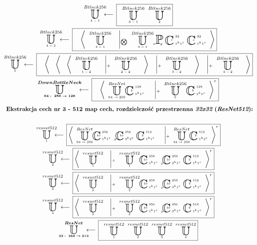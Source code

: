 \begin{equation*}
\begin{gathered}
\xunitdef{Btlnck256}{4-1}{\quad
\xunit{Btlnck256}{3-1}{} \quad
\xunit{Btlnck256}{2}{}}
\\
\xunitdef{Btlnck256}{4-2}{\quad
\xaggreg{\quad
\xunit{Btlnck256}{4-1}{}
\quad \left|_{\bigotimes} \quad
\xunit{Btlnck256}{4-1}{}
\xpool{g}{}{a}{}{}
\xconv{\ 1^k1^s}{\ 32}{}{}{r}
\xconv{\ 1^k1^s}{\ 32}{}{}{s}
\right.}}
\\
\xunitdef{Btlnck256}{5}{\quad
\xaggreg{\quad
\xaggreg{\quad
\xaggreg{\quad
\xunit{Btlnck256}{1-2}{}
\quad \left|_+ \quad
\xunit{Btlnck256}{2-2}{}
\right.\quad}
\quad \left|_+ \quad
\xunit{Btlnck256}{3-2}{}
\right.\quad}
\quad \left|_+ \quad
\xunit{Btlnck256}{4-2}{}
\right.\quad}}
\\
\xunitdef{\boldsymbol{DownBottleNeck}}{\boldsymbol{64:\ 256\rightarrow128}}{\quad
\xaggreg{\quad
\xunit{ResNet}{64\rightarrow256}{}
\xconv{\ 1^k1^s}{\ 128}{}{}{b}
\quad \left|_+ \quad
\xunit{Btlnck256}{5}{}
\xconv{\ 1^k1^s}{\ 128}{}{}{b}
\right.}^r}
\end{gathered}
\end{equation*}
\begin{equation*}
\begin{gathered}
\textbf{Ekstrakcja cech nr 3 - 512 map cech, rozdzielczość przestrzenna $\textit{32x32}$ ($\textit{ResNet512}$):}
\\~\\
\xunitdef{resnet512}{1}{
\xaggreg{\quad
\xunit{ResNet}{64\rightarrow256}{}
\xconv{\ 1^k1^s}{\ 256}{}{}{br}
\xconv{\ 3^k2^s}{\ 256}{p}{}{br}
\xconv{\ 1^k1^s}{\ 512}{}{}{b}
\quad \left|_+ \quad
\xunit{ResNet}{64\rightarrow256}{}
\xconv{\ 1^k2^s}{\ 512}{}{}{b}
\right.}^r}
\\
\xunitdef{resnet512}{2}{
\xaggreg{\quad
\xunit{resnet512}{1}{}
\quad \left|_+ \quad
\xunit{resnet512}{1}{}
\xconv{\ 1^k1^s}{\ 256}{}{}{br}
\xconv{\ 3^k1^s}{\ 256}{p}{}{br}
\xconv{\ 1^k1^s}{\ 512}{}{}{b}
\right.}^r}
\\
\xunitdef{resnet512}{3}{
\xaggreg{\quad
\xunit{resnet512}{2}{}
\quad \left|_+ \quad
\xunit{resnet512}{2}{}
\xconv{\ 1^k1^s}{\ 256}{}{}{br}
\xconv{\ 3^k1^s}{\ 256}{p}{}{br}
\xconv{\ 1^k1^s}{\ 512}{}{}{b}
\right.}^r}
\\
\xunitdef{resnet512}{4}{
\xaggreg{\quad
\xunit{resnet512}{3}{}
\quad \left|_+ \quad
\xunit{resnet512}{3}{}
\xconv{\ 1^k1^s}{\ 256}{}{}{br}
\xconv{\ 3^k1^s}{\ 256}{p}{}{br}
\xconv{\ 1^k1^s}{\ 512}{}{}{b}
\right.}^r}
\\
\xunitdef{\boldsymbol{ResNet}}{\boldsymbol{32:\ 256\rightarrow512}}{ \quad
\xunit{resnet512}{1}{} \quad
\xunit{resnet512}{2}{} \quad
\xunit{resnet512}{3}{} \quad
\xunit{resnet512}{4}{}}
\end{gathered}
\end{equation*}
